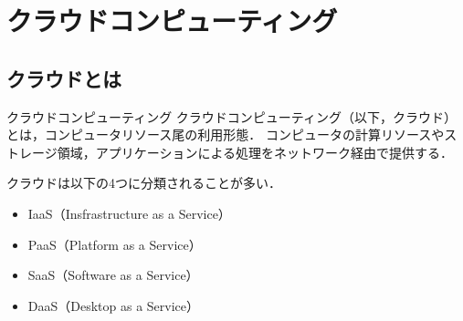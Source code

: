 \section{クラウドコンピューティング}
\subsection{クラウドとは}
\begin{frame}[t]{\ftitle}
    \begin{block}{クラウドコンピューティング}
        クラウドコンピューティング（以下，クラウド）とは，コンピュータリソース尾の利用形態．
        コンピュータの計算リソースやストレージ領域，アプリケーションによる処理をネットワーク経由で提供する．\hfill\cite{2015amazon}
    \end{block}
    クラウドは以下の4つに分類されることが多い．
    \begin{itemize}
        \item IaaS（Insfrastructure as a Service）
        \item PaaS（Platform as a Service）
        \item SaaS（Software as a Service）
        \item DaaS（Desktop as a Service）%
    \end{itemize}
\end{frame}